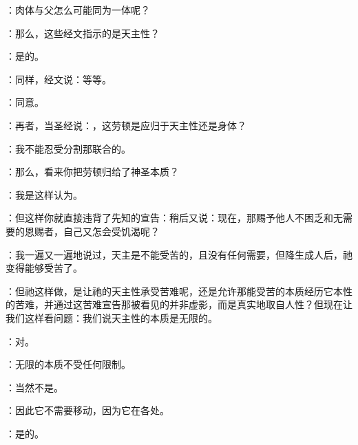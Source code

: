 ：肉体与父怎么可能同为一体呢？\par

：那么，这些经文指示的是天主性？\par

：是的。\par

：同样，经文说：等等。\par

：同意。\par

：再者，当圣经说：，这劳顿是应归于天主性还是身体？\par

：我不能忍受分割那联合的。\par

：那么，看来你把劳顿归给了神圣本质？\par

：我是这样认为。\par

：但这样你就直接违背了先知的宣告：稍后又说：现在，那赐予他人不困乏和无需要的恩赐者，自己又怎会受饥渴呢？\par

：我一遍又一遍地说过，天主是不能受苦的，且没有任何需要，但降生成人后，祂变得能够受苦了。\par

：但祂这样做，是让祂的天主性承受苦难呢，还是允许那能受苦的本质经历它本性的苦难，并通过这苦难宣告那被看见的并非虚影，而是真实地取自人性？但现在让我们这样看问题：我们说天主性的本质是无限的。\par

：对。\par

：无限的本质不受任何限制。\par

：当然不是。\par

：因此它不需要移动，因为它在各处。\par

：是的。\par

